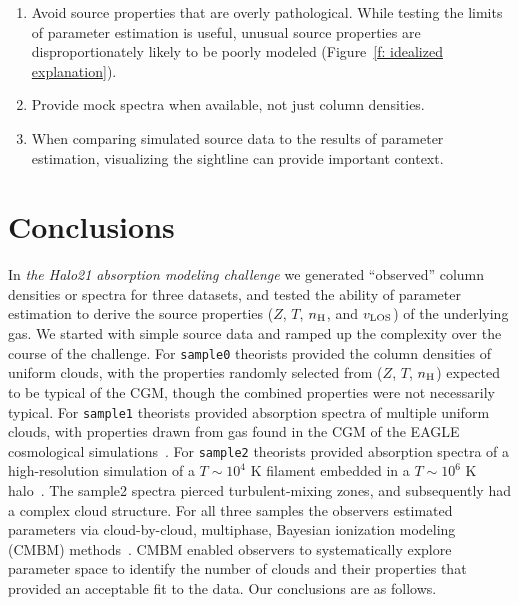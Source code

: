 \documentclass[fleqn,usenatbib]{mnras}
\begin{document}
\begin{enumerate}
    \item Avoid source properties that are overly pathological. While testing the limits of  parameter estimation is useful, unusual source properties are disproportionately likely to be poorly modeled (Figure~\ref{f: idealized explanation}).
    \item Provide mock spectra when available, not just column densities.
    \item When comparing simulated source data to the results of parameter estimation, visualizing the sightline can provide important context.
\end{enumerate}

\section{Conclusions}
\label{s: conclusions}

In \textit{the Halo21 absorption modeling challenge} we generated ``observed'' column densities or spectra for three datasets,
and tested the ability of parameter estimation to derive the source properties ($Z$, $T$, $n_{\rm H}$, and $v_{\rm LOS}$) of the underlying gas.
We started with simple source data and ramped up the complexity over the course of the challenge.
For \texttt{sample0} theorists provided the column densities of uniform clouds, with the properties randomly selected from ($Z$, $T$, $n_{\rm H}$) expected to be typical of the CGM, though the combined properties were not necessarily typical.
For \texttt{sample1} theorists provided absorption spectra of multiple uniform clouds, with properties drawn from gas found in the CGM of the EAGLE cosmological simulations~\citep[e.g.][]{schaye2015EAGLE}.
For \texttt{sample2} theorists provided absorption spectra of a high-resolution simulation of a $T \sim 10^4$ K filament embedded in a $T \sim 10^6$ K halo~\citep{mandelker2020Instability}.
The sample2 spectra pierced turbulent-mixing zones, and subsequently had a complex cloud structure.
For all three samples the observers estimated parameters via cloud-by-cloud, multiphase, Bayesian ionization modeling (CMBM) methods~\citep{sameer2021Cloudbycloud, sameer2022Probing}.
CMBM enabled observers to systematically explore parameter space to identify the number of clouds and their properties that provided an acceptable fit to the data.
Our conclusions are as follows.
\end{document}
